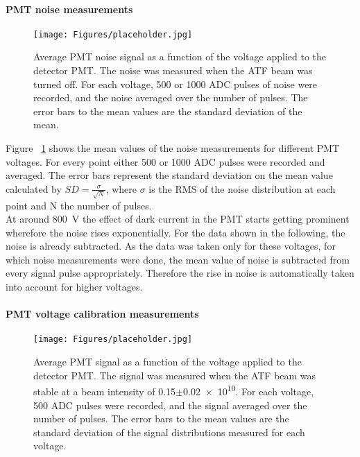 \paragraph{PMT noise measurements}
\begin{figure}
\centering
\texttt{[image: Figures/placeholder.jpg]}%
\caption[RHUL Cherenkov detector noise]{Average PMT noise signal as a function of the voltage applied to the detector PMT. The noise was measured when the ATF beam was turned off. For each voltage, 500 or 1000 ADC pulses of noise were recorded, and the noise averaged over the number of pulses. The error bars to the mean values are the standard deviation of the mean.}
\label{fig:AverageNoise}
\end{figure}
Figure ~\ref{fig:AverageNoise} shows the mean values of the noise measurements for different PMT voltages. For every point either 500 or 1000 ADC pulses were recorded and averaged. The error bars represent the standard deviation on the mean value calculated by $SD=\frac{\sigma}{\sqrt{N}}$, where $\sigma$ is the RMS of the noise distribution at each point and N the number of pulses.\\
At around \SI{800}{\volt} the effect of dark current in the PMT starts getting prominent wherefore the noise rises exponentially. For the data shown in the following, the noise is already subtracted. As the data was taken only for these voltages, for which noise measurements were done, the mean value of noise is subtracted from every signal pulse appropriately. Therefore the rise in noise is automatically taken into account for higher voltages.

\paragraph{PMT voltage calibration measurements}
\begin{figure}
\centering
\texttt{[image: Figures/placeholder.jpg]}%
\caption[RHUL Cherenkov detector voltage calibration]{Average PMT signal as a function of the voltage applied to the detector PMT. The signal was measured when the ATF beam was stable at a beam intensity of \num{0.15}$\pm$\num{0.02e10}. For each voltage, 500 ADC pulses were recorded, and the signal averaged over the number of pulses. The error bars to the mean values are the standard deviation of the signal distributions measured for each voltage.}
\label{fig:VoltageNormalization}
\end{figure}

